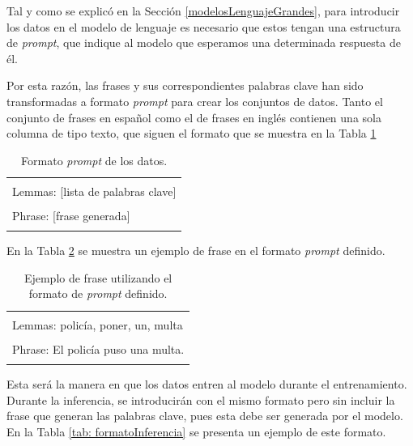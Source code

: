 \documentclass[11pt,spanish,listoffigures,listoftables]{tfgetsinf}
\begin{document}
Tal y como se explicó en la Sección \ref{modelosLenguajeGrandes}, para introducir los datos en el modelo de lenguaje es necesario que estos tengan una estructura de \textit{prompt}, que indique al modelo que esperamos una determinada respuesta de él.

Por esta razón, las frases y sus correspondientes palabras clave han sido transformadas a formato \textit{prompt} para crear los conjuntos de datos. Tanto el conjunto de frases en español como el de frases en inglés contienen una sola columna de tipo texto, que siguen el formato que se muestra en la Tabla \ref{tab: formatoPrompt}

\begin{table}[!h]
\caption{Formato \textit{prompt} de los datos.}
\begin{center}
\begin{tabular}{ | l | }
\hline
	\\
	Lemmas: [lista de palabras clave] \\
	\\
	Phrase: [frase generada] \\
	\\
\hline
\end{tabular}
\end{center}
\label{tab: formatoPrompt}
\end{table}

En la Tabla \ref{tab: ejemploPrompt} se muestra un ejemplo de frase en el formato \textit{prompt} definido.

\begin{table}[!h]
\caption{Ejemplo de frase utilizando el formato de \textit{prompt} definido.}
\begin{center}
\begin{tabular}{ | l | }
\hline
	\\
	Lemmas: policía, poner, un, multa \\
	\\
	Phrase: El policía puso una multa. \\
	\\
\hline
\end{tabular}
\end{center}
\label{tab: ejemploPrompt}
\end{table}


Esta será la manera en que los datos entren al modelo durante el entrenamiento. Durante la inferencia, se introducirán con el mismo formato pero sin incluir la frase que generan las palabras clave, pues esta debe ser generada por el modelo. En la Tabla  \ref{tab: formatoInferencia} se presenta un ejemplo de este formato.
\end{document}
